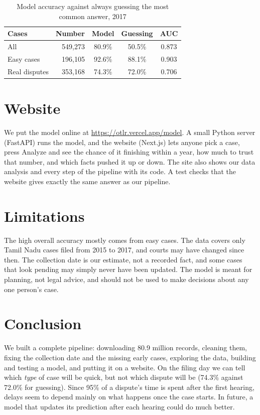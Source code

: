 \documentclass[11pt,a4paper]{article}
\begin{document}
\begin{table}[H]
\caption{Model accuracy against always guessing the most common answer, 2017}
\label{tab:split}
\centering\small
\begin{tabular}{@{}lrccc@{}}
\toprule
Cases & Number & Model & Guessing & AUC \\
\midrule
All & 549,273 & 80.9\% & 50.5\% & 0.873 \\
Easy cases & 196,105 & 92.6\% & 88.1\% & 0.903 \\
Real disputes & 353,168 & 74.3\% & 72.0\% & 0.706 \\
\bottomrule
\end{tabular}
\end{table}

\section{Website}
We put the model online at \url{https://otlr.vercel.app/model}. A small Python server (FastAPI)
runs the model, and the website (Next.js) lets anyone pick a case, press Analyze and see the
chance of it finishing within a year, how much to trust that number, and which facts pushed it up
or down. The site also shows our data analysis and every step of the pipeline with its code. A
test checks that the website gives exactly the same answer as our pipeline.

\section{Limitations}
The high overall accuracy mostly comes from easy cases. The data covers only Tamil Nadu cases filed
from 2015 to 2017, and courts may have changed since then. The collection date is our estimate,
not a recorded fact, and some cases that look pending may simply never have been updated. The
model is meant for planning, not legal advice, and should not be used to make decisions about any
one person's case.

\section{Conclusion}
We built a complete pipeline: downloading 80.9 million records, cleaning them, fixing the
collection date and the missing early cases, exploring the data, building and testing a model, and
putting it on a website. On the filing day we can tell which \emph{type} of case will be quick, but
not which dispute will be (74.3\% against 72.0\% for guessing). Since 95\% of a dispute's time is
spent after the first hearing, delays seem to depend mainly on what happens once the case starts.
In future, a model that updates its prediction after each hearing could do much better.
\end{document}
